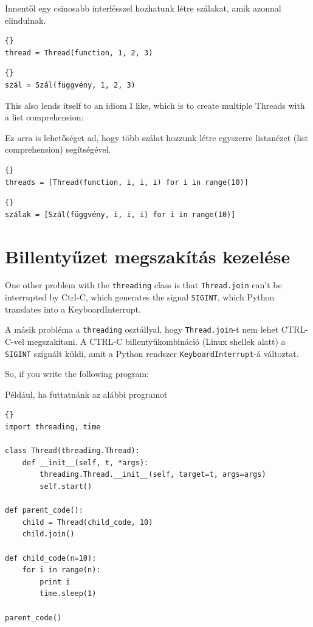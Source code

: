 \documentclass{book}
\begin{document}
Innentől egy csinosabb interfésszel hozhatunk létre szálakat,
amik azonnal elindulnak.

\begin{lstlisting}[title={Thread example (my way)}]{}
thread = Thread(function, 1, 2, 3)
\end{lstlisting}

\begin{lstlisting}[title={Szál példa (ahogy én szeretem)}]{}
szál = Szál(függvény, 1, 2, 3)
\end{lstlisting}

This also lends itself to an idiom I like, which is to create
multiple Threads with a list comprehension:

Ez arra is lehetőséget ad, hogy több szálat hozzunk
létre egyszerre listanézet (list comprehension) segítségével.

\begin{lstlisting}[title={Multiple thread example}]{}
threads = [Thread(function, i, i, i) for i in range(10)]
\end{lstlisting}

\begin{lstlisting}[title={Több szál példa}]{}
szálak = [Szál(függvény, i, i, i) for i in range(10)]
\end{lstlisting}

\section{Billentyűzet megszakítás kezelése}

One other problem with the {\tt threading} class is that 
{\tt Thread.join} can't be interrupted by Ctrl-C, which
generates the signal {\tt SIGINT}, which Python translates
into a KeyboardInterrupt.

A másik probléma a {\tt threading} osztállyal, hogy
{\tt Thread.join}-t nem lehet CTRL-C-vel megszakítani.
A CTRL-C billentyűkombináció (Linux shellek alatt)
a {\tt SIGINT} szignált küldi, amit a Python rendszer
{\tt KeyboardInterrupt}-á változtat.

\newpage
So, if you write the following program:

Például, ha futtatnánk az alábbi programot

\begin{lstlisting}[title={Unstoppable program}]{}
import threading, time

class Thread(threading.Thread):
    def __init__(self, t, *args):
        threading.Thread.__init__(self, target=t, args=args)
        self.start()

def parent_code():
    child = Thread(child_code, 10)
    child.join()

def child_code(n=10):
    for i in range(n):
        print i
        time.sleep(1)
    
parent_code()
\end{lstlisting}
\end{document}
